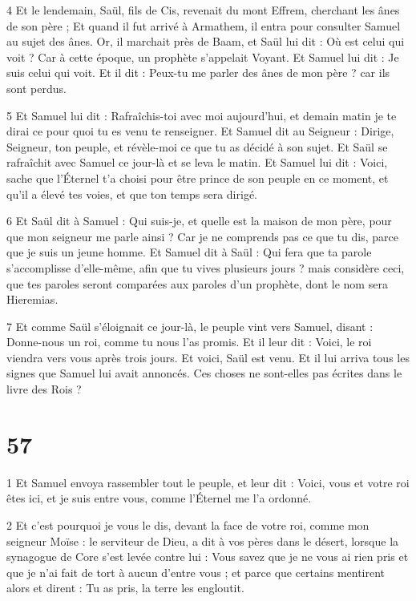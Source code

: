 \par 4 Et le lendemain, Saül, fils de Cis, revenait du mont Effrem, cherchant les ânes de son père ; Et quand il fut arrivé à Armathem, il entra pour consulter Samuel au sujet des ânes. Or, il marchait près de Baam, et Saül lui dit : Où est celui qui voit ? Car à cette époque, un prophète s’appelait Voyant. Et Samuel lui dit : Je suis celui qui voit. Et il dit : Peux-tu me parler des ânes de mon père ? car ils sont perdus.

\par 5 Et Samuel lui dit : Rafraîchis-toi avec moi aujourd'hui, et demain matin je te dirai ce pour quoi tu es venu te renseigner. Et Samuel dit au Seigneur : Dirige, Seigneur, ton peuple, et révèle-moi ce que tu as décidé à son sujet. Et Saül se rafraîchit avec Samuel ce jour-là et se leva le matin. Et Samuel lui dit : Voici, sache que l'Éternel t'a choisi pour être prince de son peuple en ce moment, et qu'il a élevé tes voies, et que ton temps sera dirigé.

\par 6 Et Saül dit à Samuel : Qui suis-je, et quelle est la maison de mon père, pour que mon seigneur me parle ainsi ? Car je ne comprends pas ce que tu dis, parce que je suis un jeune homme. Et Samuel dit à Saül : Qui fera que ta parole s'accomplisse d'elle-même, afin que tu vives plusieurs jours ? mais considère ceci, que tes paroles seront comparées aux paroles d'un prophète, dont le nom sera Hieremias.

\par 7 Et comme Saül s'éloignait ce jour-là, le peuple vint vers Samuel, disant : Donne-nous un roi, comme tu nous l'as promis. Et il leur dit : Voici, le roi viendra vers vous après trois jours. Et voici, Saül est venu. Et il lui arriva tous les signes que Samuel lui avait annoncés. Ces choses ne sont-elles pas écrites dans le livre des Rois ?

\chapter{57}

\par 1 Et Samuel envoya rassembler tout le peuple, et leur dit : Voici, vous et votre roi êtes ici, et je suis entre vous, comme l'Éternel me l'a ordonné.

\par 2 Et c'est pourquoi je vous le dis, devant la face de votre roi, comme mon seigneur Moïse : le serviteur de Dieu, a dit à vos pères dans le désert, lorsque la synagogue de Core s'est levée contre lui : Vous savez que je ne vous ai rien pris et que je n'ai fait de tort à aucun d'entre vous ; et parce que certains mentirent alors et dirent : Tu as pris, la terre les engloutit.

